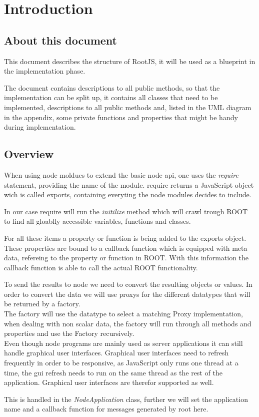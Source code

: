 \chapter{Introduction}
\section{About this document}
This document describes the structure of RootJS, it will be used as a blueprint in the implementation phase.

The document contains descriptions to all public methods, so that the implementation can be split up, it contains all classes that need to be implemented, descriptions to all public methods and, listed in the UML diagram in the appendix, some private functions and properties that might be handy during implementation.

\section{Overview}
When using node moldues to extend the basic node api, one uses the \textit{require} statement, providing the name of the module.
require returns a JavaScript object wich is called exports, containing everyting the node modules decides to include.

In our case require will run the \textit{initilize} method which will crawl trough ROOT to find all gloablly accessible variables, functions and classes.

For all these items a property or function is being added to the exports object.
These properties are bound to a callback function which is equipped with meta data, refereing to the property or function in ROOT.
With this information the callback function is able to call the actual ROOT functionality.

To send the results to node we need to convert the resulting objects or values.
In order to convert the data we will use proxys for the different datatypes that will be returned by a factory.\\

The factory will use the datatype to select a matching Proxy implementation, when dealing with non scalar data, the factory will run through all methods and properties and use the Factory recursively.\\

Even though node programs are mainly used as server applications it can still handle graphical user interfaces.
Graphical user interfaces need to refresh frequently in order to be responsive, as JavaScript only runs one thread at a time, the gui refresh needs to run on the same thread as the rest of the application. Graphical user interfaces are therefor supported as well.

This is handled in the \textit{NodeApplication} class, further we will set the application name and a callback function for messages generated by root here.
